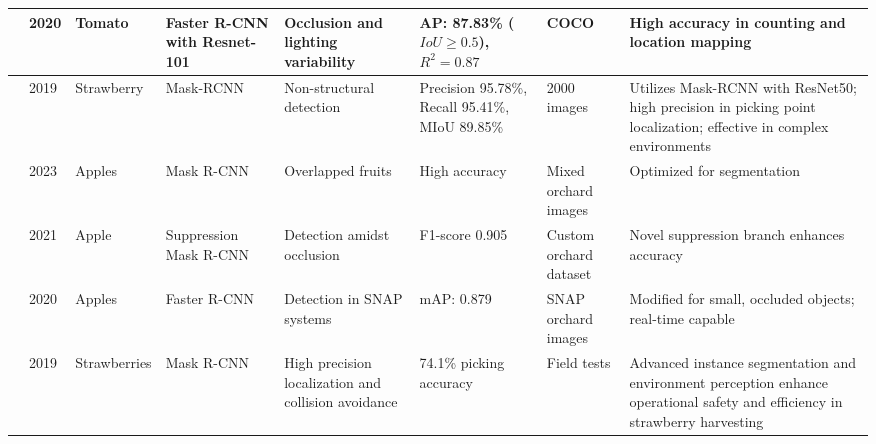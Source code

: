 \documentclass[a4paper,fleqn]{cas-dc}
\begin{document}
\begin{table}[htbp]
\begin{tabular}{@{}p{0.4cm}p{0.4cm}p{1.4cm}p{1.8cm}p{2cm}p{1.8cm}p{2cm}p{4.3cm}@{}}
\cite{mu2020intact} & 2020 & Tomato & Faster R-CNN with Resnet-101 & Occlusion and lighting variability & AP: 87.83\% ($IoU \geq 0.5$), $R^2 = 0.87$ & COCO & High accuracy in counting and location mapping \\ \midrule
\cite{yu2019fruit}& 2019 & Strawberry & Mask-RCNN & Non-structural detection & Precision 95.78\%, Recall 95.41\%, MIoU 89.85\% & 2000 images & Utilizes Mask-RCNN with ResNet50; high precision in picking point localization; effective in complex environments \\ \midrule
\cite{jia2020detection} & 2023 & Apples & Mask R-CNN & Overlapped fruits & High accuracy & Mixed orchard images & Optimized for segmentation \\ \midrule

\cite{chu2021deep} & 2021 & Apple & Suppression Mask R-CNN & Detection amidst occlusion & F1-score 0.905 & Custom orchard dataset & Novel suppression branch enhances accuracy \\ \midrule
\cite{gao2020multi} & 2020 & Apples & Faster R-CNN & Detection in SNAP systems & mAP: 0.879 & SNAP orchard images & Modified for small, occluded objects; real-time capable \\ \midrule
\cite{ge2019fruit} & 2019 & Strawberries & Mask R-CNN & High precision localization and collision avoidance & 74.1\% picking accuracy & Field tests & Advanced instance segmentation and environment perception enhance operational safety and efficiency in strawberry harvesting \\ \bottomrule
\end{tabular}
\end{table}	
\end{document}
